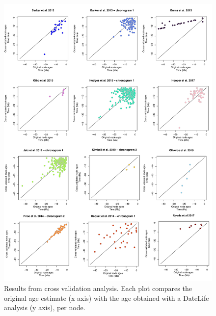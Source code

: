 \documentclass[
  english,
  man]{apa6}
\begin{document}
\begin{figure}[!h]
\includegraphics{../figures/figure-cross-validation/fig-cross-validation-xy-plots.pdf}
\caption{Results from cross validation analysis. Each plot compares the original age estimate (x axis) with the age obtained with a DateLife analysis (y axis), per node.}
\label{fig:cvXY}
\end{figure}
\end{document}
